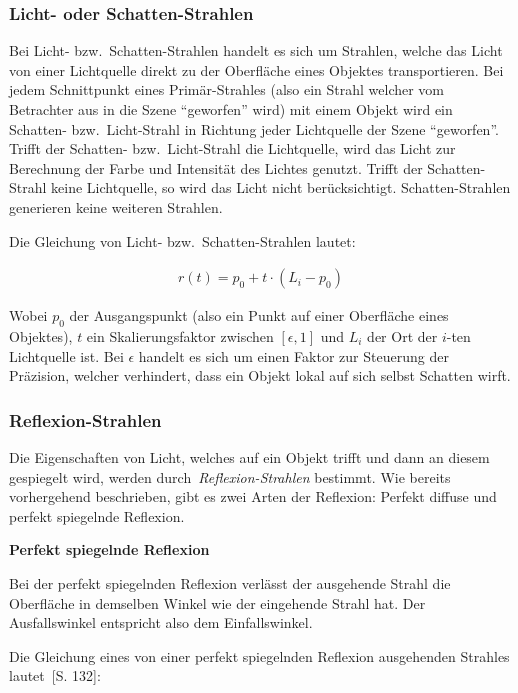 \subsubsection{Licht- oder Schatten-Strahlen}
\label{ssubsec:ray_tracing:shadow_rays}
Bei Licht- bzw.\ Schatten-Strahlen handelt es sich um Strahlen, welche
das Licht von einer Lichtquelle direkt zu der Oberfläche eines
Objektes transportieren. Bei jedem Schnittpunkt eines Primär-Strahles
(also ein Strahl welcher vom Betrachter aus in die Szene ``geworfen''
wird) mit einem Objekt wird ein Schatten- bzw.\ Licht-Strahl in Richtung jeder
Lichtquelle der Szene ``geworfen''. Trifft der Schatten- bzw.\
Licht-Strahl die Lichtquelle, wird das Licht zur Berechnung der Farbe
und Intensität des Lichtes genutzt. Trifft der Schatten-Strahl keine
Lichtquelle, so wird das Licht nicht berücksichtigt. Schatten-Strahlen
generieren keine weiteren Strahlen.

Die Gleichung von Licht- bzw.\ Schatten-Strahlen lautet:

\begin{gather}
    r(t) = p_{0} + t \cdot (L_{i} - p_{0})
\end{gather}

Wobei $p_{0}$ der Ausgangspunkt (also ein Punkt auf einer Oberfläche
eines Objektes), $t$ ein Skalierungsfaktor zwischen $[\epsilon, 1]$ und
$L_{i}$ der Ort der $i$-ten Lichtquelle ist. Bei $\epsilon$ handelt es
sich um einen Faktor zur Steuerung der Präzision, welcher verhindert,
dass ein Objekt lokal auf sich selbst Schatten wirft.


\subsubsection{Reflexion-Strahlen}
\label{ssubsec:ray_tracing:reflection_rays}

Die Eigenschaften von Licht, welches auf ein Objekt trifft und dann an
diesem gespiegelt wird, werden durch~\textit{Reflexion-Strahlen}
bestimmt. Wie bereits vorhergehend beschrieben, gibt es zwei Arten der
Reflexion: Perfekt diffuse und perfekt spiegelnde Reflexion.

\textbf{Perfekt spiegelnde Reflexion}

Bei der perfekt spiegelnden Reflexion verlässt der ausgehende Strahl die
Oberfläche in demselben Winkel wie der eingehende Strahl hat. Der
Ausfallswinkel entspricht also dem Einfallswinkel.

Die Gleichung eines von einer perfekt spiegelnden Reflexion ausgehenden
Strahles lautet~\cite{glassner_introduction_1989}[S. 132]:

